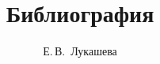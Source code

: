 \documentclass[12pt,a4paper]{article}
\begin{document}
	\author[i]{Е.\,В.~Лукашева}
	\title{Библиография}
	\date{}
	\maketitle~\nocite{*}
	\printbibliography
\end{document}

